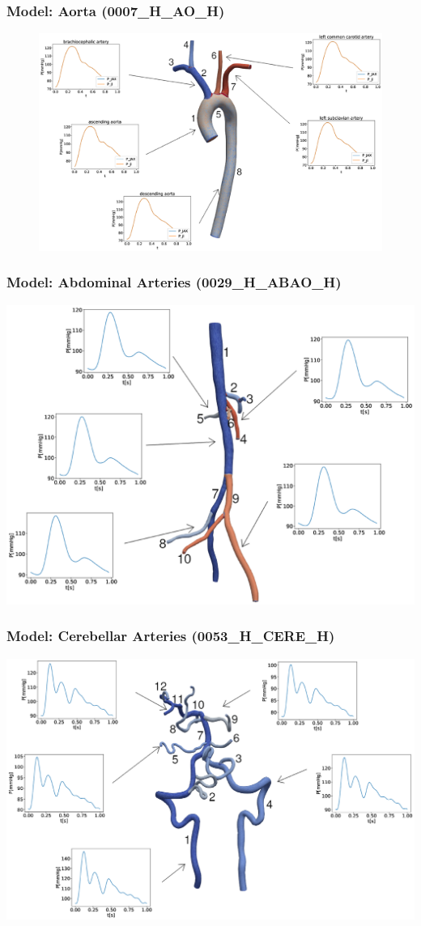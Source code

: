 \documentclass{beamer}
\begin{document}
\begin{frame}
	\frametitle{Model: Aorta (0007\_H\_AO\_H)}
	\begin{figure} [H]
		\centering
		\includegraphics[width=\columnwidth]{images/0007.eps}
		\label{fig:aorta}
	\end{figure}
\end{frame}
\begin{frame}
	\frametitle{Model: Abdominal Arteries (0029\_H\_ABAO\_H)}
	\includegraphics[width=\columnwidth]{images/0029.eps}
\end{frame}
\begin{frame}
	\frametitle{Model: Cerebellar Arteries (0053\_H\_CERE\_H)}
	\includegraphics[width=\columnwidth]{images/0053.eps}
\end{frame}
\end{document}
